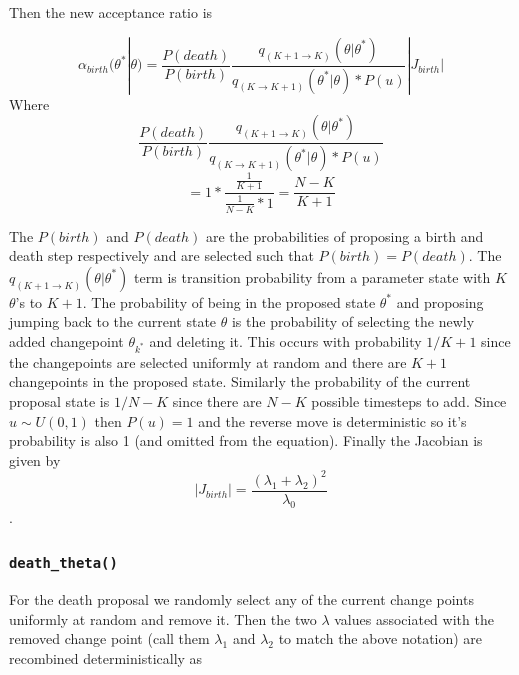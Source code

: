 \documentclass[11pt,a4paper]{article}
\numberwithin{equation}{section}
\begin{document}
Then the new acceptance ratio is

\[\alpha_{birth}(\theta^*|\theta) = \frac{P(death)}{P(birth)}\frac{q_{(K+1\rightarrow K)}(\theta|\theta^*)}{q_{(K\rightarrow K + 1)}(\theta^*|\theta)*P(u)}|J_{birth}|\]
Where
\[  \frac{P(death)}{P(birth)}\frac{q_{(K+1\rightarrow K)}(\theta|\theta^*)}{q_{(K\rightarrow K + 1)}(\theta^*|\theta)*P(u)} \]
\[= 1*\frac{\frac{1}{K+1}}{\frac{1}{N-K}*1} = \frac{N-K}{K+1} \]

The \(P(birth)\) and \(P(death)\) are the probabilities of proposing a
birth and death step respectively and are selected such that
\(P(birth) = P(death)\). The \(q_{(K+1\rightarrow K)}(\theta|\theta^*)\)
term is transition probability from a parameter state with \(K\)
\(\theta\)'s to \(K+1\). The probability of being in the proposed state
\(\theta^*\) and proposing jumping back to the current state \(\theta\)
is the probability of selecting the newly added changepoint
\(\theta_{k^*}\) and deleting it. This occurs with probability \(1/K+1\)
since the changepoints are selected uniformly at random and there are
\(K+1\) changepoints in the proposed state. Similarly the probability of
the current proposal state is \(1/N-K\) since there are \(N-K\) possible
timesteps to add. Since \(u \sim U(0,1)\) then \(P(u) = 1\) and the
reverse move is deterministic so it's probability is also 1 (and omitted
from the equation). Finally the Jacobian is given by
\[ |J_{birth}| = \frac{(\lambda_1 + \lambda_2)^2}{\lambda_0}\] .

\hypertarget{death_theta}{%
\subsubsection{\texorpdfstring{\texttt{death\_theta()}}{death\_theta()}}\label{death_theta}}

For the death proposal we randomly select any of the current change
points uniformly at random and remove it. Then the two \(\lambda\)
values associated with the removed change point (call them \(\lambda_1\)
and \(\lambda_2\) to match the above notation) are recombined
deterministically as
\end{document}
